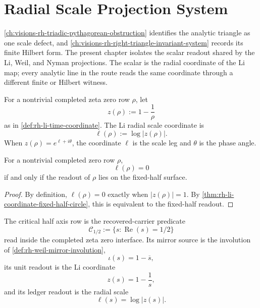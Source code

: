 \chapter{Radial Scale Projection System}
\label{ch:visions-rh-radial-scale-projection-system}

\autoref{ch:visions-rh-triadic-pythagorean-obstruction} identifies the
analytic triangle as one scale defect, and
\autoref{ch:visions-rh-right-triangle-invariant-system} records its
finite Hilbert form.  The present chapter isolates the scalar readout
shared by the Li, Weil, and Nyman projections.  The scalar is the radial
coordinate of the Li map; every analytic line in the route reads the
same coordinate through a different finite or Hilbert witness.

\begin{definition}
\label{def:rh-li-radial-scale-coordinate}
For a nontrivial completed zeta zero row $\rho$, let
$$
z(\rho):=1-\frac{1}{\rho}
$$
as in \autoref{def:rh-li-time-coordinate}.  The Li radial scale
coordinate is
$$
\ell(\rho):=\log|z(\rho)|.
$$
When $z(\rho)=e^{\ell+i\theta}$, the coordinate $\ell$ is the scale
leg and $\theta$ is the phase angle.
\end{definition}

\begin{theorem}
\label{thm:rh-radial-scale-fixed-half-surface}
For a nontrivial completed zero row $\rho$,
$$
\ell(\rho)=0
$$
if and only if the readout of $\rho$ lies on the fixed-half surface.
\end{theorem}

\begin{proof}
By definition, $\ell(\rho)=0$ exactly when $|z(\rho)|=1$.  By
\autoref{thm:rh-li-coordinate-fixed-half-circle}, this is equivalent to
the fixed-half readout.
\end{proof}

\begin{definition}
\label{def:rh-critical-half-axis-row}
The critical half axis row is the recovered-carrier predicate
$$
\mathcal C_{1/2}:=\{s:\operatorname{Re}(s)=1/2\}
$$
read inside the completed zeta zero interface.  Its mirror source is
the involution of \autoref{def:rh-weil-mirror-involution},
$$
\iota(s)=1-\overline{s},
$$
its unit readout is the Li coordinate
$$
z(s)=1-\frac1s,
$$
and its ledger readout is the radial scale
$$
\ell(s)=\log|z(s)|.
$$
\end{definition}

